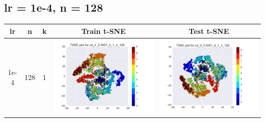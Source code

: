 \documentclass[12pt]{report}
\begin{document}
\subsection{lr = 1e-4, n = 128}
\begin{table}[H]
  \centering
  \begin{tabular}{ | c | c | c | c || c |}
    \hline
    \textbf{lr} & \textbf{n} & \textbf{k} & \textbf{Train t-SNE} & \textbf{Test t-SNE}\\ \hline
    1e-4 & 128 & 1 &
    \begin{minipage}{.3\textwidth}
      \includegraphics[scale=0.25]{cd_lr_0_0001_k_1_n_128.png}
    \end{minipage} &
    \begin{minipage}{.3\textwidth}
      \includegraphics[scale=0.25]{test_cd_lr_0_0001_k_1_n_128.png}

\end{minipage}
\end{tabular}
\end{table}
\end{document}
